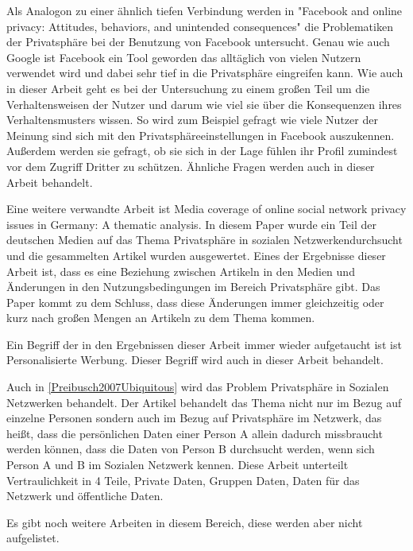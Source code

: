 Als Analogon zu einer ähnlich tiefen Verbindung werden in "Facebook and online privacy: Attitudes, behaviors, and unintended consequences" \cite{debatin2009facebook} die Problematiken der Privatsphäre bei der Benutzung von Facebook untersucht. Genau wie auch Google ist Facebook ein Tool geworden das alltäglich von vielen Nutzern verwendet wird und dabei sehr tief in die Privatsphäre eingreifen kann. Wie auch in dieser Arbeit geht es bei der Untersuchung zu einem großen Teil um die Verhaltensweisen der Nutzer und darum wie viel sie über die Konsequenzen ihres Verhaltensmusters wissen. So wird zum Beispiel gefragt wie viele Nutzer der Meinung sind sich mit den Privatsphäreeinstellungen in Facebook auszukennen. Außerdem werden sie gefragt, ob sie sich in der Lage fühlen ihr Profil zumindest vor dem Zugriff Dritter zu schützen. Ähnliche Fragen werden auch in dieser Arbeit behandelt.

Eine weitere verwandte Arbeit ist \glqq Media coverage of online social network privacy issues in Germany: A thematic analysis\grqq \cite{rizk2009media}. In diesem Paper wurde ein Teil der deutschen Medien auf das Thema \glqq Privatsphäre in sozialen Netzwerken\grqq durchsucht und die gesammelten Artikel wurden ausgewertet. Eines der Ergebnisse dieser Arbeit ist, dass es eine Beziehung zwischen Artikeln in den Medien und Änderungen in den Nutzungsbedingungen im Bereich Privatsphäre gibt. Das Paper kommt zu dem Schluss, dass diese Änderungen immer gleichzeitig oder kurz nach großen Mengen an Artikeln zu dem Thema kommen.

Ein Begriff der in den Ergebnissen dieser Arbeit immer wieder aufgetaucht ist ist \glqq Personalisierte Werbung\grqq . Dieser Begriff wird auch in dieser Arbeit behandelt.

Auch in \ref{Preibusch2007Ubiquitous} wird das Problem Privatsphäre in Sozialen Netzwerken behandelt. Der Artikel behandelt das Thema nicht nur im Bezug auf einzelne Personen sondern auch im Bezug auf Privatsphäre im Netzwerk, das heißt, dass die persönlichen Daten einer Person A allein dadurch missbraucht werden können, dass die Daten von Person B durchsucht werden, wenn sich Person A und B im Sozialen Netzwerk kennen. Diese Arbeit unterteilt Vertraulichkeit in 4 Teile, Private Daten, Gruppen Daten, Daten für das Netzwerk und öffentliche Daten.

Es gibt noch weitere Arbeiten in diesem Bereich, diese werden aber nicht aufgelistet.